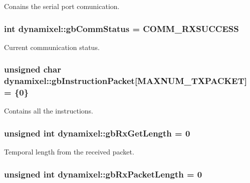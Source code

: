 Conains the serial port comunication. 

\hypertarget{a00003_a5b603f6bed7ccc595f1f50bd6a6ebbfc}{}
\subsubsection[{gb\+Comm\+Status}]{\setlength{\rightskip}{0pt plus 5cm}int dynamixel\+::gb\+Comm\+Status = C\+O\+M\+M\+\_\+\+R\+X\+S\+U\+C\+C\+E\+S\+S\hspace{0.3cm}{\ttfamily [private]}}\label{a00003_a5b603f6bed7ccc595f1f50bd6a6ebbfc}


Current communication status. 

\hypertarget{a00003_afd94dcf01b8e96298727776e222de722}{}
\subsubsection[{gb\+Instruction\+Packet}]{\setlength{\rightskip}{0pt plus 5cm}unsigned char dynamixel\+::gb\+Instruction\+Packet\mbox{[}M\+A\+X\+N\+U\+M\+\_\+\+T\+X\+P\+A\+C\+K\+E\+T\mbox{]} = \{0\}\hspace{0.3cm}{\ttfamily [private]}}\label{a00003_afd94dcf01b8e96298727776e222de722}


Contains all the instructions. 

\hypertarget{a00003_a9d590ce24791d111c2db9b66be1e046d}{}
\subsubsection[{gb\+Rx\+Get\+Length}]{\setlength{\rightskip}{0pt plus 5cm}unsigned int dynamixel\+::gb\+Rx\+Get\+Length = 0\hspace{0.3cm}{\ttfamily [private]}}\label{a00003_a9d590ce24791d111c2db9b66be1e046d}


Temporal length from the received packet. 

\hypertarget{a00003_a333686e1b5903d16c41df8172b6bd5a8}{}
\subsubsection[{gb\+Rx\+Packet\+Length}]{\setlength{\rightskip}{0pt plus 5cm}unsigned int dynamixel\+::gb\+Rx\+Packet\+Length = 0\hspace{0.3cm}{\ttfamily [private]}}\label{a00003_a333686e1b5903d16c41df8172b6bd5a8}


